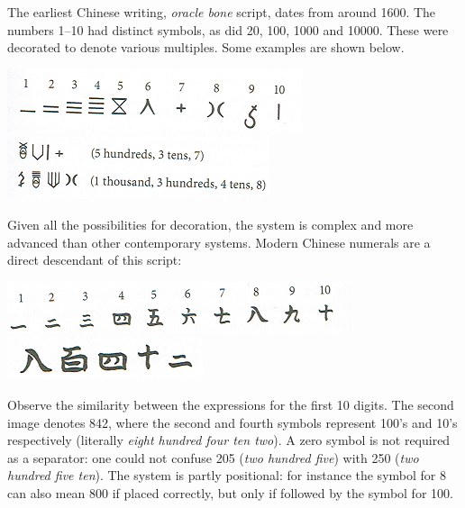 The earliest Chinese writing, \emph{oracle bone} script, dates from around 1600\BC. The numbers 1--10 had distinct symbols, as did 20, 100, 1000 and 10000. These were decorated to denote various multiples. Some examples are shown below. 
\begin{center}
	\includegraphics[angle=1.4]{OracleBones-small.png}
  \includegraphics[angle=1.5]{OracleBones2-small.png}
\end{center}
Given all the possibilities for decoration, the system is complex and more advanced than other contemporary systems. Modern Chinese numerals are a direct descendant of this script:
\begin{center}
  \includegraphics[angle=-1.5]{ModernChinese-small.png}
  \includegraphics[angle=-1.5]{824ModernChinese-small.png}
\end{center}
Observe the similarity between the expressions for the first 10 digits. The second image denotes 842, where the second and fourth symbols represent 100's and 10's respectively (literally \emph{eight hundred four ten two}). A zero symbol is not required as a separator: one could not confuse 205 (\emph{two hundred five}) with 250 (\emph{two hundred five ten}). The system is partly positional: for instance the symbol for 8 can also mean 800 if placed correctly, but only if followed by the symbol for 100.


  
